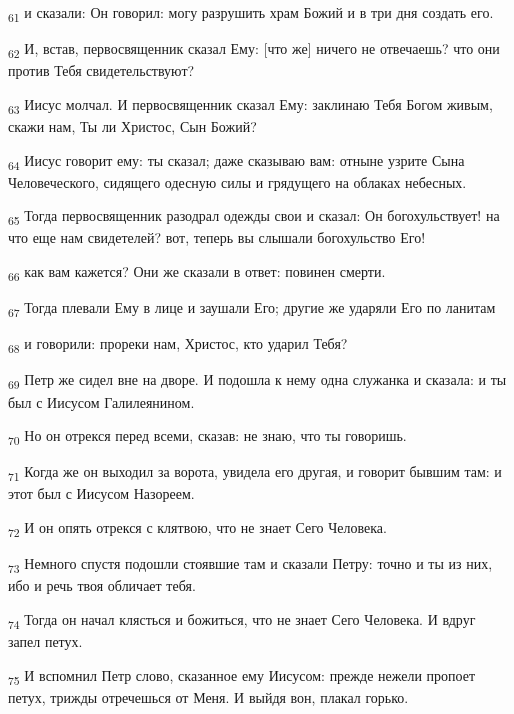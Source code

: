 \begin{tcolorbox}
\textsubscript{61} и сказали: Он говорил: могу разрушить храм Божий и в три дня создать его.
\end{tcolorbox}
\begin{tcolorbox}
\textsubscript{62} И, встав, первосвященник сказал Ему: [что же] ничего не отвечаешь? что они против Тебя свидетельствуют?
\end{tcolorbox}
\begin{tcolorbox}
\textsubscript{63} Иисус молчал. И первосвященник сказал Ему: заклинаю Тебя Богом живым, скажи нам, Ты ли Христос, Сын Божий?
\end{tcolorbox}
\begin{tcolorbox}
\textsubscript{64} Иисус говорит ему: ты сказал; даже сказываю вам: отныне узрите Сына Человеческого, сидящего одесную силы и грядущего на облаках небесных.
\end{tcolorbox}
\begin{tcolorbox}
\textsubscript{65} Тогда первосвященник разодрал одежды свои и сказал: Он богохульствует! на что еще нам свидетелей? вот, теперь вы слышали богохульство Его!
\end{tcolorbox}
\begin{tcolorbox}
\textsubscript{66} как вам кажется? Они же сказали в ответ: повинен смерти.
\end{tcolorbox}
\begin{tcolorbox}
\textsubscript{67} Тогда плевали Ему в лице и заушали Его; другие же ударяли Его по ланитам
\end{tcolorbox}
\begin{tcolorbox}
\textsubscript{68} и говорили: прореки нам, Христос, кто ударил Тебя?
\end{tcolorbox}
\begin{tcolorbox}
\textsubscript{69} Петр же сидел вне на дворе. И подошла к нему одна служанка и сказала: и ты был с Иисусом Галилеянином.
\end{tcolorbox}
\begin{tcolorbox}
\textsubscript{70} Но он отрекся перед всеми, сказав: не знаю, что ты говоришь.
\end{tcolorbox}
\begin{tcolorbox}
\textsubscript{71} Когда же он выходил за ворота, увидела его другая, и говорит бывшим там: и этот был с Иисусом Назореем.
\end{tcolorbox}
\begin{tcolorbox}
\textsubscript{72} И он опять отрекся с клятвою, что не знает Сего Человека.
\end{tcolorbox}
\begin{tcolorbox}
\textsubscript{73} Немного спустя подошли стоявшие там и сказали Петру: точно и ты из них, ибо и речь твоя обличает тебя.
\end{tcolorbox}
\begin{tcolorbox}
\textsubscript{74} Тогда он начал клясться и божиться, что не знает Сего Человека. И вдруг запел петух.
\end{tcolorbox}
\begin{tcolorbox}
\textsubscript{75} И вспомнил Петр слово, сказанное ему Иисусом: прежде нежели пропоет петух, трижды отречешься от Меня. И выйдя вон, плакал горько.
\end{tcolorbox}
